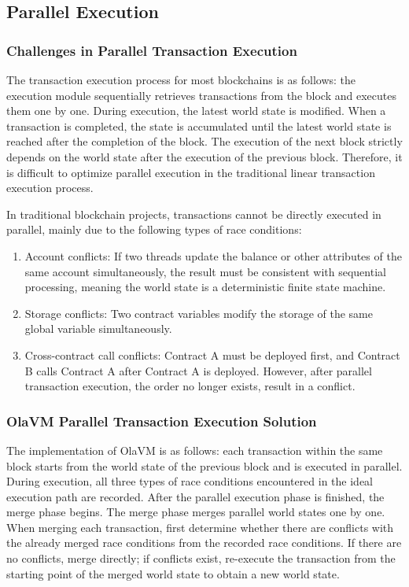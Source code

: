 \subsection{Parallel Execution}\label{section: parallel-execution}

\subsubsection{Challenges in Parallel Transaction Execution}

The transaction execution process for most blockchains is as follows: the execution module sequentially retrieves transactions from the block and executes them one by one. During execution, the latest world state is modified. When a transaction is completed, the state is accumulated until the latest world state is reached after the completion of the block. The execution of the next block strictly depends on the world state after the execution of the previous block. Therefore, it is difficult to optimize parallel execution in the traditional linear transaction execution process.

In traditional blockchain projects, transactions cannot be directly executed in parallel, mainly due to the following types of race conditions:

\begin{enumerate}
    \item Account conflicts: If two threads update the balance or other attributes of the same account simultaneously, the result must be consistent with sequential processing, meaning the world state is a deterministic finite state machine.
    \item Storage conflicts: Two contract variables modify the storage of the same global variable simultaneously.
    \item Cross-contract call conflicts: Contract A must be deployed first, and Contract B calls Contract A after Contract A is deployed. However, after parallel transaction execution, the order no longer exists, result in a conflict.
\end{enumerate}

\subsubsection{OlaVM Parallel Transaction Execution Solution}

The implementation of OlaVM is as follows: each transaction within the same block starts from the world state of the previous block and is executed in parallel. During execution, all three types of race conditions encountered in the ideal execution path are recorded. After the parallel execution phase is finished, the merge phase begins. The merge phase merges parallel world states one by one. When merging each transaction, first determine whether there are conflicts with the already merged race conditions from the recorded race conditions. If there are no conflicts, merge directly; if conflicts exist, re-execute the transaction from the starting point of the merged world state to obtain a new world state.

